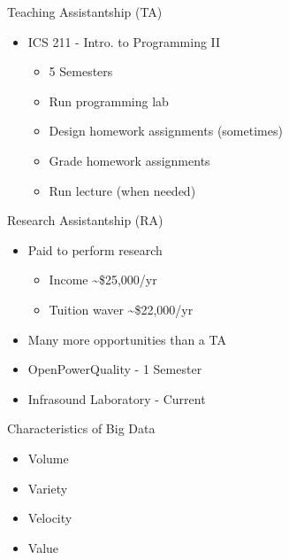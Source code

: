 \documentclass{beamer}
\begin{document}
\begin{frame}{Teaching Assistantship (TA)}
\begin{itemize}
	\item ICS 211 - Intro. to Programming II
	\begin{itemize}
		\item 5 Semesters
		\item Run programming lab
		\item Design homework assignments (sometimes)
		\item Grade homework assignments
		\item Run lecture (when needed)
	\end{itemize}
\end{itemize}
\end{frame}


\begin{frame}{Research Assistantship (RA)}
\begin{itemize}
	\item Paid to perform research 
	\begin{itemize}
		\item Income \textasciitilde\$25,000/yr
		\item Tuition waver \textasciitilde\$22,000/yr
	\end{itemize}
	\item Many more opportunities than a TA
	\item OpenPowerQuality - 1 Semester
	\item Infrasound Laboratory - Current
\end{itemize}
\end{frame}

\begin{frame}{Characteristics of Big Data}
\begin{itemize}
	\item Volume
	\item Variety
	\item Velocity
	\item Value
\end{itemize}
\end{frame}
\end{document}
